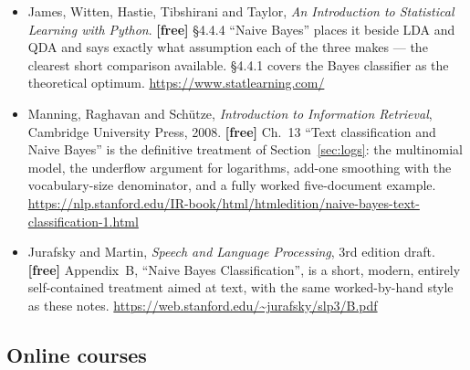 \documentclass[11pt]{article}
\begin{document}
\begin{itemize}[leftmargin=*]
    hypotheses, \S6.9 the naive Bayes classifier with the same
    \emph{PlayTennis} table used in Section~\ref{sec:hand}, and \S6.10 the
    text-classification application of Section~\ref{sec:logs}.
  \item James, Witten, Hastie, Tibshirani and Taylor, \emph{An Introduction to
    Statistical Learning with Python}. \textbf{[free]} \S4.4.4 ``Naive
    Bayes'' places it beside LDA and QDA and says exactly what assumption
    each of the three makes --- the clearest short comparison available.
    \S4.4.1 covers the Bayes classifier as the theoretical optimum.
    \url{https://www.statlearning.com/}
  \item Manning, Raghavan and Sch\"utze, \emph{Introduction to Information
    Retrieval}, Cambridge University Press, 2008. \textbf{[free]} Ch.~13
    ``Text classification and Naive Bayes'' is the definitive treatment of
    Section~\ref{sec:logs}: the multinomial model, the underflow argument for
    logarithms, add-one smoothing with the vocabulary-size denominator, and
    a fully worked five-document example.
    \url{https://nlp.stanford.edu/IR-book/html/htmledition/naive-bayes-text-classification-1.html}
  \item Jurafsky and Martin, \emph{Speech and Language Processing}, 3rd
    edition draft. \textbf{[free]} Appendix~B, ``Naive Bayes
    Classification'', is a short, modern, entirely self-contained
    treatment aimed at text, with the same worked-by-hand style as these
    notes. \url{https://web.stanford.edu/~jurafsky/slp3/B.pdf}
\end{itemize}

\subsection*{Online courses}
\end{document}
